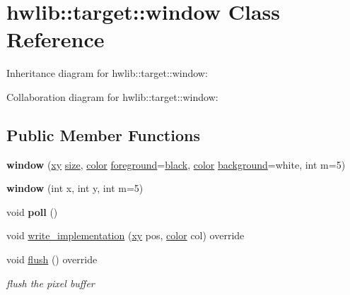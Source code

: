 \hypertarget{classhwlib_1_1target_1_1window}{}\section{hwlib\+:\+:target\+:\+:window Class Reference}
\label{classhwlib_1_1target_1_1window}


Inheritance diagram for hwlib\+:\+:target\+:\+:window\+:


Collaboration diagram for hwlib\+:\+:target\+:\+:window\+:
\subsection*{Public Member Functions}
\begin{DoxyCompactItemize}
\item 
\mbox{\label{classhwlib_1_1target_1_1window_a6ccacf6e033df6b33c4c3944d9b86dcd}} 
{\bfseries window} (\hyperlink{classhwlib_1_1xy}{xy} \hyperlink{classhwlib_1_1window_ad2ad5281c9c09d18010b19cb807d3eaa}{size}, \hyperlink{classhwlib_1_1color}{color} \hyperlink{classhwlib_1_1window_a812e3bf440309bf3280d34fa04eeb718}{foreground}=\hyperlink{namespacehwlib_aa9c056fa29bc9af9f55d4b774bb3898a}{black}, \hyperlink{classhwlib_1_1color}{color} \hyperlink{classhwlib_1_1window_a1ca47e79ec54ea8b2f38b41b42593d2d}{background}=white, int m=5)
\item 
\mbox{\label{classhwlib_1_1target_1_1window_a73bf147c1b4348fae0f78395ab1b164a}} 
{\bfseries window} (int x, int y, int m=5)
\item 
\mbox{\label{classhwlib_1_1target_1_1window_aa0d41fa8c4b4fa8671b1f4d9d6f4988d}} 
void {\bfseries poll} ()
\item 
void \hyperlink{classhwlib_1_1target_1_1window_ae432e3dc481e789f5d972331eb1f6725}{write\+\_\+implementation} (\hyperlink{classhwlib_1_1xy}{xy} pos, \hyperlink{classhwlib_1_1color}{color} col) override
\item 
void \hyperlink{classhwlib_1_1target_1_1window_a00ef1d2bba8684306ee8051fbf469900}{flush} () override
\begin{DoxyCompactList}\small\item\em flush the pixel buffer \end{DoxyCompactList}\item 

\end{DoxyCompactItemize}
